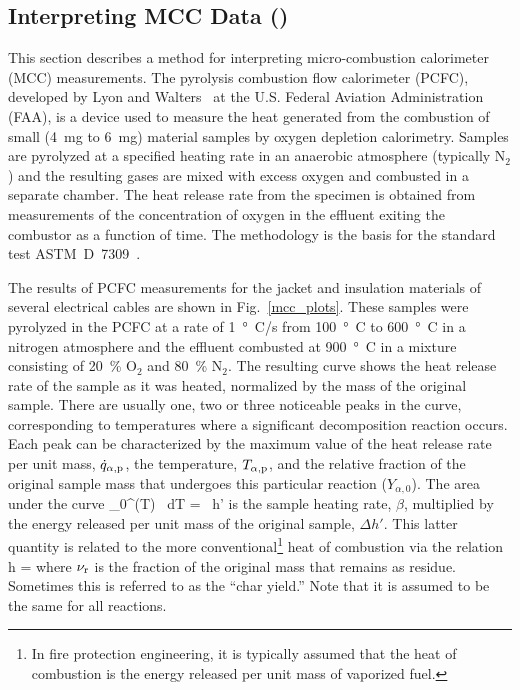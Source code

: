 \documentclass[11pt]{book}
\begin{document}
\subsection{Interpreting MCC Data (\texorpdfstring{}{cable\_XX\_mcc})}
\label{cable_11_mcc}
\label{cable_23_insulation}
\label{cable_701_insulation}
\label{cable_11_insulation}
\label{cable_11_jacket}
\label{cable_23_jacket}
\label{cable_701_jacket}

This section describes a method for interpreting micro-combustion calorimeter (MCC) measurements. The pyrolysis combustion flow calorimeter (PCFC), developed by Lyon and Walters~\cite{Lyon:JAAP2004} at the U.S. Federal Aviation Administration (FAA), is a device used to measure the heat generated from the combustion of small (4~mg to 6~mg) material samples by oxygen depletion calorimetry. Samples are pyrolyzed at a specified heating rate in an anaerobic atmosphere (typically N$_2$) and the resulting gases are mixed with excess oxygen and combusted in a separate chamber. The heat release rate from the specimen is obtained from measurements of the concentration of oxygen in the effluent exiting the combustor as a function of time. The methodology is the basis for the standard test ASTM~D~7309~\cite{microcc}.

The results of PCFC measurements for the jacket and insulation materials of several electrical cables are shown in Fig.~\ref{mcc_plots}. These samples were pyrolyzed in the PCFC at a rate of 1~\si{\degree C}/s from 100~\si{\degree C} to 600~\si{\degree C} in a nitrogen atmosphere and the effluent combusted at 900~\si{\degree C} in a mixture consisting of 20~\% O$_2$ and 80~\% N$_2$. The resulting curve shows the heat release rate of the sample as it was heated, normalized by the mass of the original sample. There are usually one, two or three noticeable peaks in the curve, corresponding to temperatures where a significant decomposition reaction occurs. Each peak can be characterized by the maximum value of the heat release rate per unit mass, $\dot{q}_{\alpha,{\rm p}}$, the temperature, $T_{\alpha,{\rm p}}$, and the relative fraction of the original sample mass that undergoes this particular reaction ($Y_{\alpha,0}$). The area under the curve
\be
   \int_0^\infty {}(T) \, dT = \beta \, \Delta h'
\ee
is the sample heating rate, $\beta$, multiplied by the energy released per unit mass of the original sample, $\Delta h'$. This latter quantity is related to the more conventional\footnote{In fire protection engineering, it is typically assumed that the heat of combustion is the energy released per unit mass of vaporized fuel.} heat of combustion via the relation
\be
   \Delta h = 
\ee
where $\nu_{\rm r}$ is the fraction of the original mass that remains as residue. Sometimes this is referred to as the ``char yield.'' Note that it is assumed to be the same for all reactions.
\end{document}
